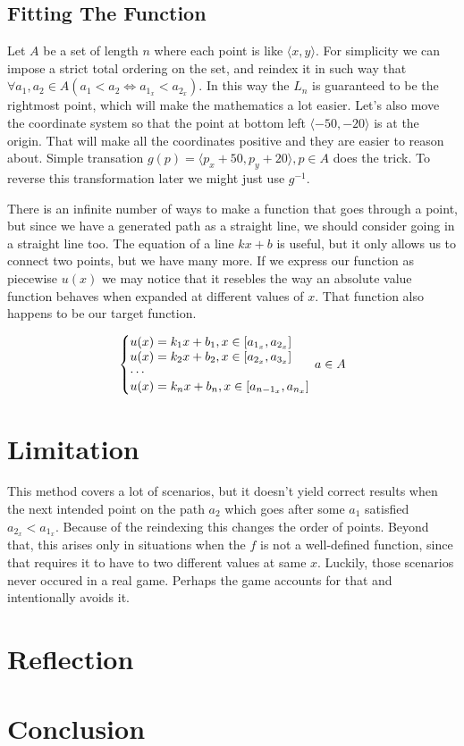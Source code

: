 \documentclass[12pt, titlepage]{article}
\begin{document}
\subsection{Fitting The Function}
Let $A$ be a set of length $n$ where each point is like $\langle x, y \rangle$.
For simplicity we can impose a strict total ordering on the set, and reindex
it in such way that $\forall a_1,a_2 \in A (a_1 < a_2 \Leftrightarrow a_{1_x} < 
a_{2_x})$. In this way the $L_n$ is guaranteed to be the rightmost point, which
will make the mathematics a lot easier. Let's also move the coordinate system
so that the point at bottom left $\langle -50, -20 \rangle$ is at the origin.
That will make all the coordinates positive and they are easier to reason about.
Simple transation $g(p) = \langle p_x + 50, p_y + 20 \rangle, p \in A$ does the
trick. To reverse this transformation later we might just use $g^{-1}$.

There is an infinite number of ways to make a function that goes through a 
point, but since we have a generated path as a straight line, 
we should consider going in a straight line too. 
The equation of a line $kx + b$ is useful, but it only allows us to
connect two points, but we have many more. If we express our function as 
piecewise $u(x)$ we may notice that it resebles the way an absolute value function 
behaves when expanded at different values of $x$. That function also happens
to be our target function. 

\begin{equation}
    \left\{\begin{array}{@{}l@{}}
        u(x) = k_1x + b_1, x \in [a_{1_x}, a_{2_x}] {}\\
        u(x) = k_2x + b_2, x \in [a_{2_x}, a_{3_x}] {}\\
        \cdots\\
        u(x) = k_nx + b_n, x \in [a_{n-1_x}, a_{n_x}] {}\\
    \end{array}\right.\,
    a \in A
\end{equation}

\section{Limitation}
This method covers a lot of scenarios, but it doesn't yield correct results
when the next intended point on the path $a_2$ which goes after some $a_1$
satisfied $a_{2_x} < a_{1_x}$. Because of the reindexing this changes the order
of points. Beyond that, this arises only in situations when the $f$ is not
a well-defined function, since that requires it to have to two different values
at same $x$. Luckily, those scenarios never occured in a real game. Perhaps 
the game accounts for that and intentionally avoids it.

\section{Reflection}

\section{Conclusion}
\end{document}
